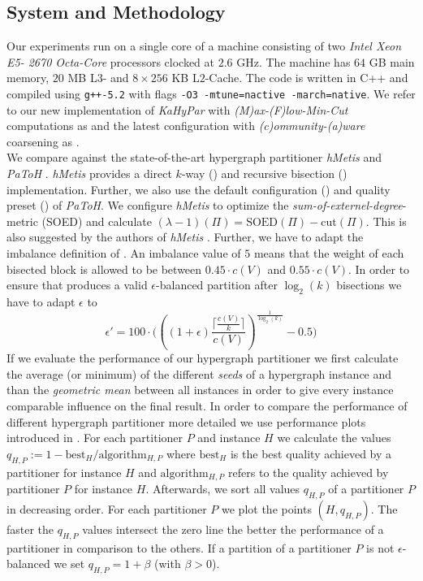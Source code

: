 \subsection{System and Methodology}
\label{sec:methodology}

Our experiments run on a single core of a machine consisting of two \emph{Intel Xeon E5-
2670 Octa-Core} processors clocked at $2.6$ GHz. The machine has $64$ GB main memory,
$20$ MB L$3$- and $8\times256$ KB L$2$-Cache. The code is written in C++ and compiled using
\lstinline{g++-5.2} with flags \lstinline{-O3 -mtune=nactive -march=native}. We refer to
our new implementation of \emph{KaHyPar} with \emph{(M)ax-(F)low-Min-Cut} computations 
as  and the latest configuration with \emph{(c)ommunity-(a)ware} coarsening as
. \\
We compare  against the state-of-the-art hypergraph partitioner \emph{hMetis} 
\cite{karypis1999multilevel,karypis2000multilevel} and \emph{PaToH} \cite{catalyurek1999hypergraph}.
\emph{hMetis} provides a direct $k$-way () and recursive bisection () implementation.
Further, we also use the default configuration () and quality preset () of
\emph{PaToH}. We configure \emph{hMetis} to optimize the \emph{sum-of-externel-degree}-metric
(SOED) and calculate $(\lambda-1)(\Pi) = \text{SOED}(\Pi) - \text{cut}(\Pi)$. This is also
suggested by the authors of \emph{hMetis} \cite{karypis2000multilevel}. Further, we have
to adapt the imbalance definition of . An imbalance value of $5$ means that the weight
of each bisected block is allowed to be between $0.45 \cdot c(V)$ and $0.55 \cdot c(V)$. In order
to ensure that  produces a valid $\epsilon$-balanced partition after $\log_2(k)$
bisections we have to adapt $\epsilon$ to
\[\epsilon' = 100 \cdot \Bigg( \left( (1 + \epsilon) \frac{\lceil \frac{c(V)}{k} \rceil}{c(V)} \right)^{\frac{1}{\log_2(k)}} - 0.5 \Bigg)\]
If we evaluate the performance of our hypergraph partitioner 
we first calculate the average (or minimum) of the different \emph{seeds} of a hypergraph
instance and than the \emph{geometric mean} between all instances in order to give every instance
comparable influence on the final result. In order to compare the performance of different 
hypergraph partitioner more detailed we use performance plots introduced in \cite{schlag2016k}.
For each partitioner $P$ and instance $H$ we calculate the values $q_{H,P} := 1 - \text{best$_H$}/\text{algorithm$_{H,P}$}$ 
where $\text{best$_{H}$}$ is the best quality achieved by a partitioner for instance $H$ and
$\text{algorithm$_{H,P}$}$ refers to the quality achieved by partitioner $P$ for instance
$H$. Afterwards, we sort all values $q_{H,P}$ of a partitioner $P$ in decreasing order. For each
partitioner $P$ we plot the points $(H,q_{H,P})$. The faster the $q_{H,P}$ values intersect
the zero line the better the performance of a partitioner in comparison to the others. If a partition
of a partitioner $P$ is not $\epsilon$-balanced we set $q_{H,P} = 1 + \beta$ (with $\beta > 0$).

